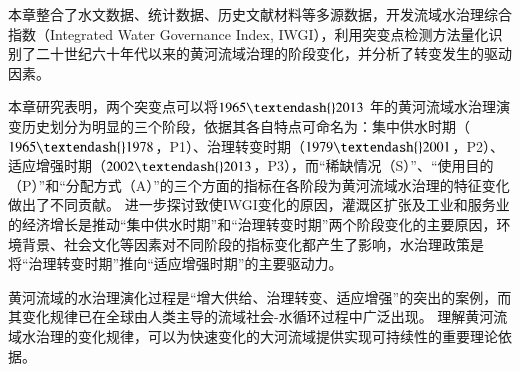 本章整合了水文数据、统计数据、历史文献材料等多源数据，开发流域水治理综合指数（Integrated Water Governance Index, IWGI），利用突变点检测方法量化识别了二十世纪六十年代以来的黄河流域治理的阶段变化，并分析了转变发生的驱动因素。

本章研究表明，两个突变点可以将$1965 \textendash{} 2013$ 年的黄河流域水治理演变历史划分为明显的三个阶段，依据其各自特点可命名为：集中供水时期（$1965 \textendash{} 1978$，P1）、治理转变时期（$1979 \textendash{} 2001$，P2）、适应增强时期（$2002 \textendash{} 2013$，P3），而“稀缺情况（S）”、“使用目的（P）”和“分配方式（A）”的三个方面的指标在各阶段为黄河流域水治理的特征变化做出了不同贡献。
进一步探讨致使IWGI变化的原因，灌溉区扩张及工业和服务业的经济增长是推动“集中供水时期”和“治理转变时期”两个阶段变化的主要原因，环境背景、社会文化等因素对不同阶段的指标变化都产生了影响，水治理政策是将“治理转变时期”推向“适应增强时期”的主要驱动力。

黄河流域的水治理演化过程是“增大供给、治理转变、适应增强”的突出的案例，而其变化规律已在全球由人类主导的流域社会-水循环过程中广泛出现。
理解黄河流域水治理的变化规律，可以为快速变化的大河流域提供实现可持续性的重要理论依据。
